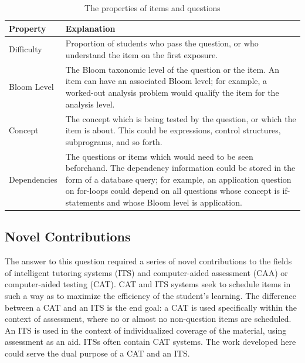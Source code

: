 \begin{table}[!p]
\label{tab:properties}
\caption{The properties of items and questions}
\vspace{12pt}
\begin{tabularx}{\textwidth}{||l|X||}
\hline \hline
\rowcolor{Gray}
Property &  Explanation  \\\hline

Difficulty & 
Proportion of students who pass the question, or who
understand the item on the first exposure.
\\ \hline
Bloom Level &
The Bloom taxonomic level of the question or the item.
An item can have an associated Bloom level; for example,
a worked-out analysis problem would qualify
the item for the analysis level.
\\ \hline
Concept & 
The concept which is being tested by the question, or
which the item is about. This could be expressions,
control structures, subprograms, and so forth.
\\ \hline
Dependencies & 
The questions or items which would need to be seen beforehand.  The dependency
information could be stored in the form of a database query; for example, an
application question on for-loops could depend on all questions whose concept
is if-statements and whose Bloom level is application.

\\ \hline \hline 
\end{tabularx}
\vspace{36pt}

\end{table}

\subsection{Novel Contributions}

The answer to this question required a series of novel contributions to the
fields of intelligent tutoring systems (ITS) and computer-aided assessment
(CAA) or computer-aided testing (CAT).  CAT and ITS systems seek to schedule
items in such a way as to maximize the efficiency of the student's learning.
The difference between a CAT and an ITS is the end goal: a CAT is used
specifically within the context of assessment, where no or almost no
non-question items are scheduled.  An ITS is used in the context of
individualized coverage of the material, using assessment as an aid.  ITSs
often contain CAT systems.  The work developed here could serve the dual
purpose of a CAT and an ITS.

